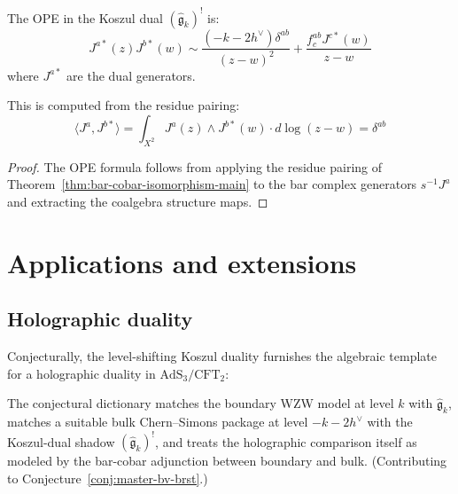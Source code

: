 \begin{theorem}
\label{thm:closed-form-ope}
The OPE in the Koszul dual $(\widehat{\mathfrak{g}}_k)^!$ is:
\begin{equation}
J^{a*}(z) J^{b*}(w) \sim \frac{(-k-2h^\vee) \delta^{ab}}{(z-w)^2} + \frac{f^{ab}_c J^{c*}(w)}{z-w}
\end{equation}
where $J^{a*}$ are the dual generators.

This is computed from the residue pairing:
\begin{equation}
\langle J^a, J^{b*} \rangle = \int_{X^2} J^a(z) \wedge J^{b*}(w) \cdot d\log(z-w) = \delta^{ab}
\end{equation}
\end{theorem}
\begin{proof}
The OPE formula follows from applying the residue pairing of Theorem~\ref{thm:bar-cobar-isomorphism-main} to the bar complex generators $s^{-1}J^a$ and extracting the coalgebra structure maps.
\end{proof}

\section{Applications and extensions}

\subsection{Holographic duality}

\begin{conjecture}\label{conj:km-holography}
Conjecturally, the level-shifting Koszul duality furnishes the algebraic template for a holographic duality in $\mathrm{AdS}_3/\mathrm{CFT}_2$:
\begin{center}
\end{center}

The conjectural dictionary matches the boundary WZW model at level $k$
with $\widehat{\mathfrak{g}}_k$, matches a suitable bulk Chern--Simons
package at level $-k-2h^\vee$ with the Koszul-dual shadow
$(\widehat{\mathfrak{g}}_k)^!$, and treats the holographic comparison
itself as modeled by the bar-cobar adjunction between boundary and
bulk.
(Contributing to Conjecture~\ref{conj:master-bv-brst}.)
\end{conjecture}

